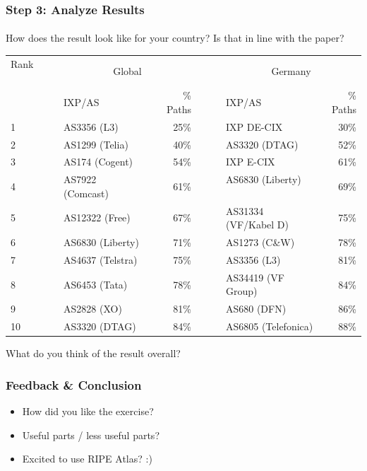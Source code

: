 \clearpage
\begin{frame}
\frametitle{Step 3: Analyze Results}
\framesubtitle{}

How does the result look like for your country? Is that in line with the paper?
\begin{table}[!h]%
	\centering		
	{\begin{tabular}{llrclr}
			\toprule
			Rank ~~~~~& \multicolumn{2}{c}{Global} && \multicolumn{2}{c}{Germany}	\\
			\cmidrule{2-3} \cmidrule{5-6}
			& IXP/AS  & \textSigma\% Paths &~~~& IXP/AS & \textSigma\% Paths   \\
			\midrule
			1 & AS3356 (L3)  & 25\%  && IXP DE-CIX & 30\% \\
			2 & AS1299 (Telia) & 40\%  && AS3320 (DTAG) & 52\% \\
			3 & AS174 (Cogent)  & 54\%  && IXP E-CIX & 61\% \\
			4 & AS7922 (Comcast)~~~  & 61\%  && AS6830 (Liberty) ~~~& 69\% \\
			5 & AS12322 (Free)  & 67\%  && AS31334 (VF/Kabel D) & 75\%\\
			6 & AS6830 (Liberty)  & 71\%  && AS1273 (C\&W)& 78\%\\
			7 & AS4637 (Telstra) & 75\%  && AS3356 (L3)  & 81\% \\
			8 & AS6453 (Tata) & 78\%  && AS34419 (VF Group)& 84\% \\
			9 & AS2828 (XO)  & 81\%  && AS680 (DFN) & 86\% \\
			10 & AS3320 (DTAG) & 84\% && AS6805 (Telefonica) & 88\% \\
			\bottomrule
	\end{tabular}}
\end{table}

\pause
What do you think of the result overall?
\end{frame}
\clearpage

\begin{frame}
\frametitle{Feedback \& Conclusion}
\begin{itemize}
	\item How did you like the exercise?
	\item Useful parts / less useful parts?
	\item Excited to use RIPE Atlas? :)
\end{itemize}
\end{frame}
\clearpage


